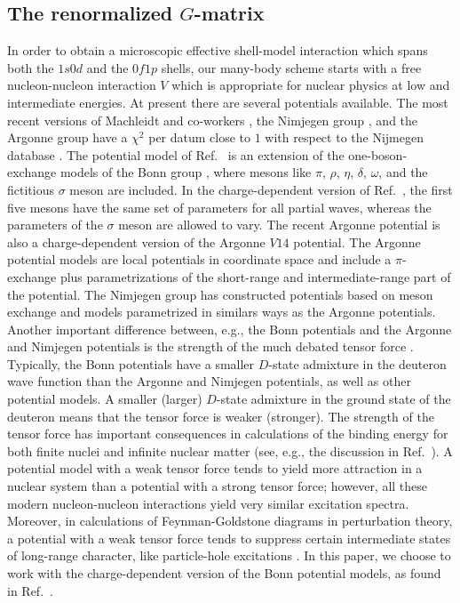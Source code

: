 \begin{multicols}{2}
\subsection{The renormalized $G$-matrix}

In order to obtain a microscopic effective shell-model interaction
which spans both the $1s0d$ and the $0f1p$ shells, our many-body
scheme starts with a free nucleon-nucleon interaction $V$ which is
appropriate for nuclear physics at low and intermediate energies.  At
present there are several potentials available. The most recent
versions of Machleidt and co-workers \cite{cdbonn}, the Nimjegen group
\cite{nim}, and the Argonne group \cite{v18} have a $\chi^2$ per datum
close to $1$ with respect to the Nijmegen database
\cite{nimbase}.  The potential model of Ref.\ \cite{cdbonn} is an
extension of the one-boson-exchange models of the Bonn group
\cite{mac89}, where mesons like $\pi$, $\rho$, $\eta$, $\delta$,
$\omega$, and the fictitious $\sigma$ meson are included. In the
charge-dependent version of Ref.\ \cite{cdbonn}, the first five mesons
have the same set of parameters for all partial waves, whereas the
parameters of the $\sigma$ meson are allowed to vary. The recent
Argonne potential \cite{v18} is also a charge-dependent version of the
Argonne $V14$ \cite{v14} potential. The Argonne potential models are
local potentials in coordinate space and include a $\pi$-exchange plus
parametrizations of the short-range and intermediate-range part of the
potential. The Nimjegen group \cite{nim} has constructed potentials
based on meson exchange and models parametrized in similars ways as
the Argonne potentials.  Another important difference between, e.g.,
the Bonn potentials and the Argonne and Nimjegen potentials is the
strength of the much debated tensor force \cite{bm95}. Typically, the
Bonn potentials have a smaller $D$-state admixture in the deuteron
wave function than the Argonne and Nimjegen potentials, as well as
other potential models. A smaller (larger) $D$-state admixture in the
ground state of the deuteron means that the tensor force is weaker
(stronger).  The strength of the tensor force has important
consequences in calculations of the binding energy for both finite
nuclei and infinite nuclear matter (see, e.g., the discussion in Ref.\
\cite{hko95}).  A potential model with a weak tensor force tends to
yield more attraction in a nuclear system than a potential with a
strong tensor force; however, all these modern nucleon-nucleon
interactions yield very similar excitation spectra. Moreover, in
calculations of Feynman-Goldstone diagrams in perturbation theory, a
potential with a weak tensor force tends to suppress certain
intermediate states of long-range character, like particle-hole
excitations \cite{sommer81}.  In this paper, we choose to work with
the charge-dependent version of the Bonn potential models, as found in
Ref.\ \cite{cdbonn}.


\end{multicols}

